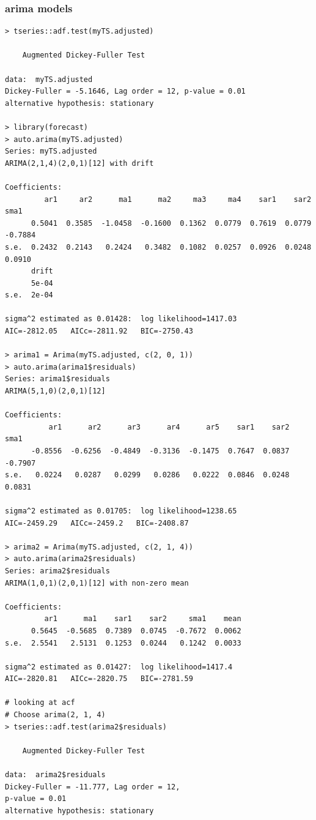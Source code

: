 \documentclass[a4paper,10pt]{article}
\begin{document}
\subsubsection{arima models}
\begin{verbatim}
> tseries::adf.test(myTS.adjusted)

	Augmented Dickey-Fuller Test

data:  myTS.adjusted
Dickey-Fuller = -5.1646, Lag order = 12, p-value = 0.01
alternative hypothesis: stationary

> library(forecast)
> auto.arima(myTS.adjusted)
Series: myTS.adjusted 
ARIMA(2,1,4)(2,0,1)[12] with drift         

Coefficients:
         ar1     ar2      ma1      ma2     ma3     ma4    sar1    sar2     sma1
      0.5041  0.3585  -1.0458  -0.1600  0.1362  0.0779  0.7619  0.0779  -0.7884
s.e.  0.2432  0.2143   0.2424   0.3482  0.1082  0.0257  0.0926  0.0248   0.0910
      drift
      5e-04
s.e.  2e-04

sigma^2 estimated as 0.01428:  log likelihood=1417.03
AIC=-2812.05   AICc=-2811.92   BIC=-2750.43

> arima1 = Arima(myTS.adjusted, c(2, 0, 1))
> auto.arima(arima1$residuals)
Series: arima1$residuals 
ARIMA(5,1,0)(2,0,1)[12]                    

Coefficients:
          ar1      ar2      ar3      ar4      ar5    sar1    sar2     sma1
      -0.8556  -0.6256  -0.4849  -0.3136  -0.1475  0.7647  0.0837  -0.7907
s.e.   0.0224   0.0287   0.0299   0.0286   0.0222  0.0846  0.0248   0.0831

sigma^2 estimated as 0.01705:  log likelihood=1238.65
AIC=-2459.29   AICc=-2459.2   BIC=-2408.87

> arima2 = Arima(myTS.adjusted, c(2, 1, 4))
> auto.arima(arima2$residuals)
Series: arima2$residuals 
ARIMA(1,0,1)(2,0,1)[12] with non-zero mean 

Coefficients:
         ar1      ma1    sar1    sar2     sma1    mean
      0.5645  -0.5685  0.7389  0.0745  -0.7672  0.0062
s.e.  2.5541   2.5131  0.1253  0.0244   0.1242  0.0033

sigma^2 estimated as 0.01427:  log likelihood=1417.4
AIC=-2820.81   AICc=-2820.75   BIC=-2781.59

# looking at acf
# Choose arima(2, 1, 4)
> tseries::adf.test(arima2$residuals)

	Augmented Dickey-Fuller Test

data:  arima2$residuals
Dickey-Fuller = -11.777, Lag order = 12,
p-value = 0.01
alternative hypothesis: stationary


\end{verbatim}
\end{document}

